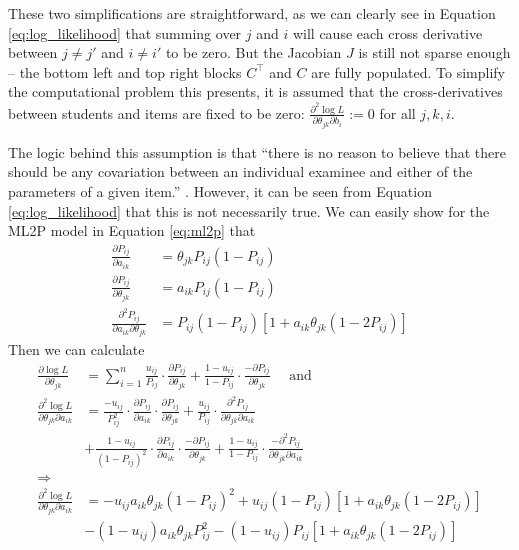 These two simplifications are straightforward, as we can clearly see in Equation \ref{eq:log_likelihood} that summing over $j$ and $i$ will cause each cross derivative between $j \not = j'$ and $i \not = i'$ to be zero. But the Jacobian $J$ is still not sparse enough -- the bottom left and top right blocks $C^\top$ and $C$ are fully populated. To simplify the computational problem this presents, it is assumed that the cross-derivatives between students and items are fixed to be zero: $\frac{\partial^2 \log L}{\partial\theta_{jk} \partial b_{i}} := 0$ for all $j,k,i$. 

The logic behind this assumption is that ``there is no reason to believe that there should be any covariation between an individual examinee and either of the parameters of a given item.'' \cite{baker_kim2004}. However, it can be seen from Equation \ref{eq:log_likelihood} that this is not necessarily true. We can easily show for the ML2P model in Equation \ref{eq:ml2p} that 
\begin{equation}
\begin{split}
  \frac{\partial P_{ij}}{\partial a_{ik}} &= \theta_{jk}P_{ij}(1-P_{ij}) \\
  \frac{\partial P_{ij}}{\partial \theta_{jk}} &= a_{ik}P_{ij}(1-P_{ij}) \\
  \frac{\partial^2 P_{ij}}{\partial a_{ik}\partial \theta_{jk}} &= P_{ij}(1-P_{ij})\left[ 1 + a_{ik} \theta_{jk} (1-2P_{ij}) \right]
\end{split}
\label{eq:ml2p_deriv}
\end{equation}
Then we can calculate
\begin{equation}
\begin{split}
  \frac{\partial \log L}{\partial \theta_{jk}} &= \sum_{i=1}^n  \frac{u_{ij}}{P_{ij}} \cdot \frac{\partial P_{ij}}{\partial \theta_{jk}} + \frac{1-u_{ij}}{1-P_{ij}} \cdot \frac{-\partial P_{ij}}{\partial \theta_{jk}} \quad \text{ and} \\
  \frac{\partial^2 \log L}{\partial \theta_{jk} \partial a_{ik}} &= \frac{-u_{ij}}{P_{ij}^2} \cdot \frac{\partial P_{ij}}{\partial a_{ik}} \cdot \frac{\partial P_{ij}}{\partial \theta_{jk}} + \frac{u_{ij}}{P_{ij}} \cdot \frac{\partial^2 P_{ij}}{\partial \theta_{jk}\partial a_{ik}} \\
  &+ \frac{1-u_{ij}}{(1-P_{ij})^2} \cdot \frac{\partial P_{ij}}{\partial a_{ik}} \cdot \frac{-\partial P_{ij}}{\partial \theta_{jk}} + \frac{1-u_{ij}}{1-P_{ij}} \cdot \frac{-\partial^2 P_{ij}}{\partial \theta_{jk} \partial a_{ik}} \\
  \Longrightarrow& \\
  \frac{\partial^2 \log L}{\partial \theta_{jk} \partial a_{ik}} &= -u_{ij}a_{ik}\theta_{jk}(1-P_{ij})^2 + u_{ij}(1-P_{ij})\left[1 + a_{ik}\theta_{jk}(1-2P_{ij})\right] \\
  &- (1-u_{ij})a_{ik}\theta_{jk}P_{ij}^2 - (1-u_{ij})P_{ij}\left[1 + a_{ik}\theta_{jk}(1-2P_{ij})\right]
\end{split}
  \label{eq:partial_deriv_nonzero}
\end{equation}
